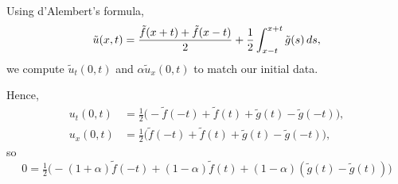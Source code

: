 \begin{solution}
  Using d'Alembert's formula,
  \[
    \tilde u(x,t) =\frac{\tilde f(x+t)+\tilde
      f(x-t)}{2}+\frac{1}{2}\int_{x-t}^{x+t}\tilde g(s)\mathop{}\!d s,
  \]
  we compute \(\tilde u_t(0,t)\) and \(\alpha\tilde u_x(0,t)\) to match
  our initial data.

  Hence,
  \begin{align*}
    u_t(0,t)&=\tfrac{1}{2}
              \bigl(-\tilde f(-t)+\tilde f(t)+\tilde g(t)-\tilde g(-t)\bigr),\\
    u_x(0,t)&=\tfrac{1}{2}
              \bigl(\tilde f(-t)+\tilde f(t)+\tilde g(t)-\tilde g(-t)\bigr),
  \end{align*}
  so
  \[
    0=\tfrac{1}{2}\bigl(-(1+\alpha)\tilde f(-t)+(1-\alpha)\tilde
    f(t)+(1-\alpha)(\tilde g(t)-\tilde g(t))\bigr)
  \]
\end{solution}


